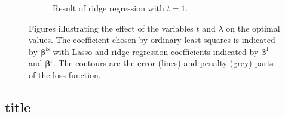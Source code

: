 \documentclass[a4paper, 12pt]{scrartcl}
\newcommand{\bfbeta}{\boldsymbol{\beta}}
\begin{document}
\begin{figure}[hb]
\begin{subfigure}{.5\textwidth}
		\label{fig:ridgepenalty}
		\caption{Result of ridge regression with $t=1$.}
	\end{subfigure}
	\caption{Figures illustrating the effect of the variables $t$ and $\lambda$ on the optimal values.
	The coefficient chosen by ordinary least squares is indicated by $\bfbeta^\mathrm{ls}$ with Lasso and ridge regression coefficients indicated by $\bfbeta^\mathrm{l}$ and $\bfbeta^\mathrm{r}$.
	The contours are the error (lines) and penalty (grey) parts of the loss function.}
\label{fig:fig}
\end{figure}


\subsection{title}
\end{document}
